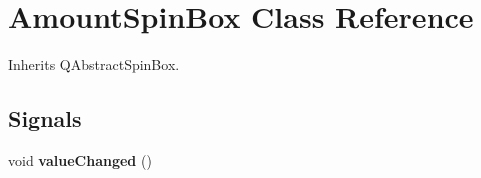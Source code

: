 \hypertarget{class_amount_spin_box}{}\section{Amount\+Spin\+Box Class Reference}
\label{class_amount_spin_box}


Inherits Q\+Abstract\+Spin\+Box.

\subsection*{Signals}
\begin{DoxyCompactItemize}
\item 
\mbox{\label{class_amount_spin_box_a702534ebb29afb3898ed262404659b7b}} 
void {\bfseries value\+Changed} ()
\end{DoxyCompactItemize}
